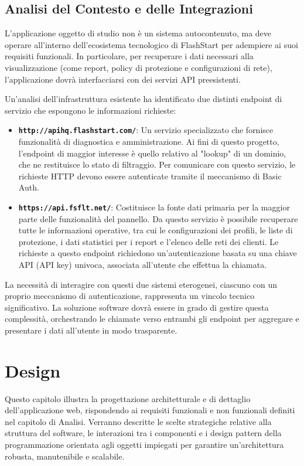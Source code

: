 \documentclass[12pt,a4paper,openright,twoside]{book}
\begin{document}
\section{Analisi del Contesto e delle Integrazioni}
\label{sec:analisi_contesto}
L'applicazione oggetto di studio non è un sistema autocontenuto, ma deve operare all'interno dell'ecosistema tecnologico di FlashStart per adempiere ai suoi requisiti funzionali. In particolare, per recuperare i dati necessari alla visualizzazione (come report, policy di protezione e configurazioni di rete), l'applicazione dovrà interfacciarsi con dei servizi API preesistenti.

Un'analisi dell'infrastruttura esistente ha identificato due distinti endpoint di servizio che espongono le informazioni richieste:
\begin{itemize}
    \item \textbf{\texttt{http://apihq.flashstart.com/}}: Un servizio specializzato che fornisce funzionalità di diagnostica e amministrazione. Ai fini di questo progetto, l'endpoint di maggior interesse è quello relativo al "lookup" di un dominio, che ne restituisce lo stato di filtraggio. Per comunicare con questo servizio, le richieste HTTP devono essere autenticate tramite il meccanismo di Basic Auth.

    \item \textbf{\texttt{https://api.fsflt.net/}}: Costituisce la fonte dati primaria per la maggior parte delle funzionalità del pannello. Da questo servizio è possibile recuperare tutte le informazioni operative, tra cui le configurazioni dei profili, le liste di protezione, i dati statistici per i report e l'elenco delle reti dei clienti. Le richieste a questo endpoint richiedono un'autenticazione basata su una chiave API (API key) univoca, associata all'utente che effettua la chiamata.
\end{itemize}
La necessità di interagire con questi due sistemi eterogenei, ciascuno con un proprio meccanismo di autenticazione, rappresenta un vincolo tecnico significativo. La soluzione software dovrà essere in grado di gestire questa complessità, orchestrando le chiamate verso entrambi gli endpoint per aggregare e presentare i dati all'utente in modo trasparente.

\chapter{Design}
\label{chap:design}

Questo capitolo illustra la progettazione architetturale e di dettaglio dell'applicazione web, rispondendo ai requisiti funzionali e non funzionali definiti nel capitolo di Analisi. Verranno descritte le scelte strategiche relative alla struttura del software, le interazioni tra i componenti e i design pattern della programmazione orientata agli oggetti impiegati per garantire un'architettura robusta, manutenibile e scalabile.
\end{document}
